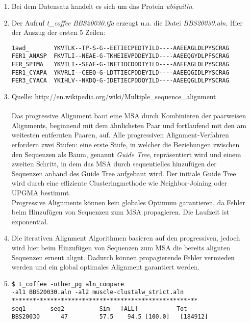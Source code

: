 \documentclass{homework}
\date{Montag, dem 12. November 2012}
\author{Stefan Meißner (4279113) und Niels Hoppe (4356370)}
\begin{document}
\maketitle
\begin{enumerate} 

\begin{enumerate}
\item Bei dem Datensatz handelt es sich um das Protein \textit{ubiquitin}.
\item Der Aufruf \textit{t\_coffee BBS20030.tfa} erzeugt u.a. die Datei \textit{BBS20030.aln}. Hier der Auszug der ersten 5 Zeilen:
\begin{verbatim}
1awd_       YKVTLK--TP-S-G--EETIECPEDTYILD----AAEEAGLDLPYSCRAG
FER1_ANASP  FKVTLI--NEAE-G-TKHEIEVPDDEYILD----AAEEQGYDLPFSCRAG
FER_SPIMA   YKVTLI--SEAE-G-INETIDCDDDTYILD----AAEEAGLDLPYSCRAG
FER1_CYAPA  YKVRLI--CEEQ-G-LDTTIECPDDEYILD----AAEEQGIDLPYSCRAG
FER3_CYACA  YKIHLV--NKDQ-G-IDETIECPDDQYILD----AAEEQGLDLPYSCRAG
\end{verbatim}
\item Quelle: http://en.wikipedia.org/wiki/Multiple\_sequence\_alignment\\ \\
Das progressive Alignment baut eine MSA durch Kombinieren der paarweisen Alignments, beginnend mit dem ähnlichsten Paar und fortlaufend mit den am weitesten entfernten Paaren, auf. Alle progressiven Alignment-Verfahren erfordern zwei Stufen: eine erste Stufe, in welcher die Beziehungen zwischen den Sequenzen als Baum, genannt \textit{Guide Tree}, repräsentiert wird und einem zweiten Schritt, in dem das MSA durch sequentielles hinzufügen der Sequenzen anhand des Guide Tree aufgebaut wird. Der initiale Guide Tree wird durch eine effiziente Clusteringmethode wie Neighbor-Joining oder UPGMA bestimmt. \\
Progressive Alignments können kein globales Optimum garantieren, da Fehler beim Hinzufügen von Sequenzen zum MSA propagieren. Die Laufzeit ist exponential.

\item Die iterativen Alignment Algorithmen basieren auf den progressiven, jedoch wird hier beim Hinzufügen von Sequenzen zum MSA die bereits alignten Sequenzen erneut alignt. Dadurch können propagierende Fehler vermieden werden und  ein global optimales Alignment garantiert werden.

\item
\begin{verbatim}
$ t_coffee -other_pg aln_compare 
-al1 BBS20030.aln -al2 muscle-clustalw_strict.aln 
*****************************************************
seq1       seq2          Sim   [ALL]           Tot  
BBS20030      47         57.5    94.5 [100.0]   [184912]


\end{verbatim}
\end{enumerate}
\end{enumerate}
\end{document}
